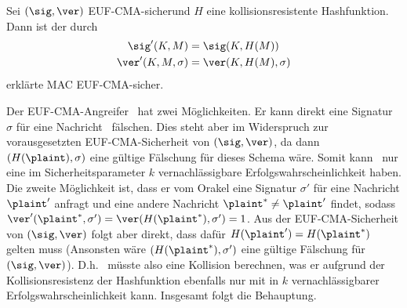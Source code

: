 \begin{theorem} Sei $(\sig, \ver)$ EUF-CMA-sicher\indexEUFCMA und $H$
  eine kollisionsresistente Hashfunktion. Dann ist der durch
  \begin{align*} \sig'(K,M) &= \sig(K,H(M))\\ \ver'(K,M,\sigma) &=
                                                                  \ver(K,H(M),\sigma)
  \end{align*} erklärte MAC EUF-CMA-sicher.~\\
\end{theorem}

\begin{beweisidee}
  \label{ch:symauth:eufcma-beweis} Der EUF-CMA-Angreifer \A~hat zwei
  Möglichkeiten. Er kann direkt eine Signatur $\sigma$ für eine Nachricht
  \plaint~fälschen. Dies steht aber im Widerspruch zur vorausgesetzten
  EUF-CMA-Sicherheit von $(\sig, \ver)$, da dann $(H(\plaint), \sigma)$
  eine gültige Fälschung für dieses Schema wäre. Somit kann \A~nur eine im
  Sicherheitsparameter $k$ vernachlässigbare Erfolgswahrscheinlichkeit
  haben. Die zweite Möglichkeit ist, dass er vom Orakel eine Signatur
  $\sigma'$ für eine Nachricht $\plaint'$ anfragt und eine andere
  Nachricht $\plaint^* \neq \plaint'$ findet, sodass $\ver'(\plaint^*, \sigma')
  = \ver(H(\plaint^*), \sigma') = 1$. Aus der EUF-CMA-Sicherheit von
  $(\sig,\ver)$ folgt aber direkt, dass dafür $H(\plaint') = H(\plaint^*)$
  gelten muss (Ansonsten wäre $(H(\plaint^*), \sigma')$ eine gültige
  Fälschung für $(\sig, \ver)$). D.h. \A~müsste also eine Kollision
  berechnen, was er aufgrund der Kollisionsresistenz der Hashfunktion
  ebenfalls nur mit in $k$ vernachlässigbarer Erfolgswahrscheinlichkeit
  kann. Insgesamt folgt die Behauptung.
\end{beweisidee}

